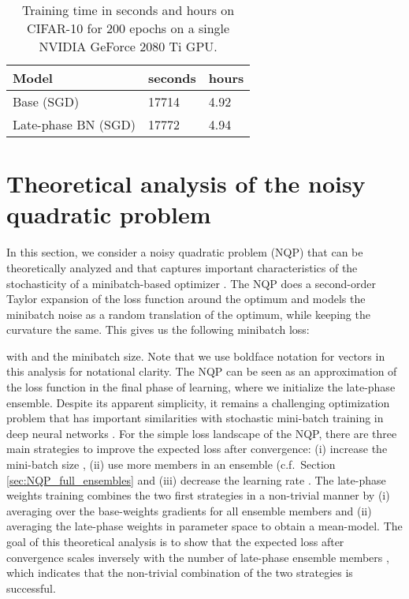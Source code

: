 \documentclass{article} \usepackage{iclr2021_conference,times}
\begin{document}
\begin{table}
\centering
\caption{Training time in seconds and hours on CIFAR-10 for 200 epochs on a single NVIDIA GeForce 2080 Ti GPU. \label{tab:runtime}}
\vspace{-0.2cm}
\begin{tabular}{lll}
\toprule
Model & seconds & hours \\\midrule
Base (SGD)      &     17714  &      4.92 \\
Late-phase BN (SGD)   &  17772 &   4.94 \\\bottomrule  
\end{tabular}
\end{table}




\section{Theoretical analysis of the noisy quadratic problem}
\label{apx:NQP}
In this section, we consider a noisy quadratic problem (NQP) that can be theoretically analyzed and that captures important characteristics of the stochasticity of a minibatch-based optimizer \citep{schaul_no_2013, martens_second-order_2016, wu_understanding_2018, zhang_which_2019, zhang_lookahead_2019}. 
The NQP does a second-order Taylor expansion of the loss function around the optimum  and models the minibatch noise as a random translation  of the optimum, while keeping the curvature  the same. This gives us the following minibatch loss:

with  and  the minibatch size. Note that we use boldface notation for vectors in this analysis for notational clarity. The NQP can be seen as an approximation of the loss function in the final phase of learning, where we initialize the late-phase ensemble. Despite its apparent simplicity, it remains a challenging optimization problem that has important similarities with stochastic mini-batch training in deep neural networks \citep{schaul_no_2013, martens_second-order_2016, wu_understanding_2018, zhang_which_2019, zhang_lookahead_2019}. For the simple loss landscape of the NQP, there are three main strategies to improve the expected loss after convergence: (i) increase the mini-batch size  \citep{zhang_which_2019}, (ii) use more members  in an ensemble (c.f.~Section \ref{sec:NQP_full_ensembles} and (iii) decrease the learning rate  \citep{schaul_no_2013, martens_second-order_2016, wu_understanding_2018, zhang_which_2019, zhang_lookahead_2019}. The late-phase weights training combines the two first strategies in a non-trivial manner by (i) averaging over the base-weights gradients for all ensemble members and (ii) averaging the late-phase weights in parameter space to obtain a mean-model. The goal of this theoretical analysis is to show that the expected loss after convergence scales inversely with the number of late-phase ensemble members , which indicates that the non-trivial combination of the two strategies is successful.
\end{document}
